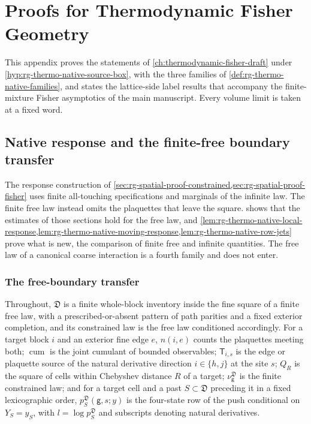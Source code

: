 \chapter{Proofs for Thermodynamic Fisher Geometry}
\label{app:thermodynamic-fisher-draft-proofs}

This appendix proves the statements of \cref{ch:thermodynamic-fisher-draft}
under \cref{hyp:rg-thermo-native-source-box}, with the three families of
\cref{def:rg-thermo-native-families}, and states the lattice-side label
results that accompany the finite-mixture Fisher asymptotics of the main
manuscript. Every volume limit is taken at a fixed word.

\section{Native response and the finite-free boundary transfer}
\label{sec:rg-thermo-native-proof}

The response construction of
\cref{sec:rg-spatial-proof-constrained,sec:rg-spatial-proof-fisher} uses
finite all-touching specifications and marginals of the infinite law. The
finite free law instead omits the plaquettes that leave the square.
 shows that the estimates of
those sections hold for the free law, and
\cref{lem:rg-thermo-native-local-response,lem:rg-thermo-native-moving-response,lem:rg-thermo-native-row-jets}
prove what is new, the comparison of finite free and infinite quantities.
The free law of a canonical coarse interaction is a fourth family and does
not enter.

\subsection{The free-boundary transfer}
\label{sec:rg-thermo-native-free-response}

Throughout, $\mathfrak D$ is a finite whole-block inventory inside the fine
square of a finite free law, with a prescribed-or-absent pattern of path
parities and a fixed exterior completion, and its constrained law is the free
law conditioned accordingly. For a target block $i$ and an exterior fine edge
$e$, $n(i,e)$ counts the plaquettes meeting both; $\operatorname{cum}$ is the
joint cumulant of bounded observables; $\mathsf T_{i,s}$ is the edge or
plaquette source of the natural derivative direction $i\in\{h,j\}$ at the
site $s$; $Q_R$ is the square of cells within Chebyshev distance $R$ of a
target; $\nu^{\mathfrak D}_{\mathsf g}$ is the finite constrained law; and for
a target cell and a past $S\subset\mathfrak D$ preceding it in a fixed
lexicographic order, $p^{\mathfrak D}_S(\mathsf g,s;y)$ is the four-state row
of the push conditional on $Y_S=y_S$, with $l=\log p^{\mathfrak D}_S$ and
subscripts denoting natural derivatives.

